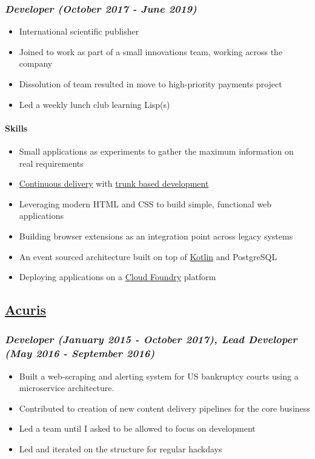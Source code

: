 \documentclass[11pt]{article}
\begin{document}
\subsubsection*{\emph{Developer (October 2017 - June 2019)}}
\label{sec:org5223faa}
\begin{itemize}
\item International scientific publisher
\item Joined to work as part of a small innovations team, working across the company
\item Dissolution of team resulted in move to high-priority payments project
\item Led a weekly lunch club learning Lisp(s)
\end{itemize}

\paragraph*{Skills}
\label{sec:org250b501}
\begin{itemize}
\item Small applications as experiments to gather the maximum information on real requirements
\item \href{https://continuousdelivery.com/}{Continuous delivery} with \href{https://trunkbaseddevelopment.com/}{trunk based development}
\item Leveraging modern HTML and CSS to build simple, functional web applications
\item Building browser extensions as an integration point across legacy systems
\item An event sourced architecture built on top of \href{https://kotlinlang.org/}{Kotlin} and PostgreSQL
\item Deploying applications on a \href{https://www.cloudfoundry.org/}{Cloud Foundry} platform
\end{itemize}

\subsection*{\href{http://www.acuris.com/}{Acuris}}
\label{sec:orge09b47d}
\subsubsection*{\emph{Developer (January 2015 - October 2017), Lead Developer (May 2016 - September 2016)}}
\label{sec:org7d99bf0}
\begin{itemize}
\item Built a web-scraping and alerting system for US bankruptcy courts using a microservice architecture.
\item Contributed to creation of new content delivery pipelines for the core business
\item Led a team until I asked to be allowed to focus on development
\item Led and iterated on the structure for regular hackdays
\end{itemize}
\end{document}
